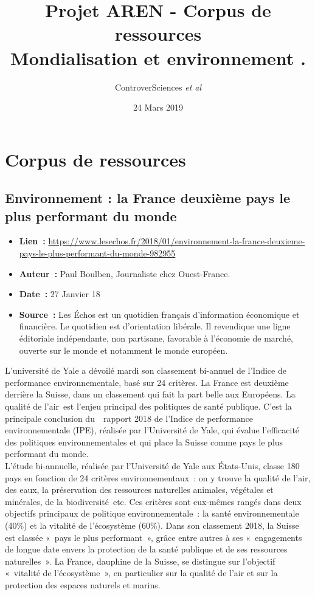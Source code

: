 \documentclass[8pt]{article}
\author{ControverSciences\textit{ et al} }
\title{Projet AREN - Corpus de ressources \\  Mondialisation et environnement .}
\date{24 Mars 2019}
\begin{document}
\section{Corpus de ressources}
\subsection{Environnement : la France deuxième pays le plus performant du monde}
\label{sec:definition}

\begin{itemize}
	\setlength\itemsep{-0.1em}
	\item \textbf{Lien~: }  \url{https://www.lesechos.fr/2018/01/environnement-la-france-deuxieme-pays-le-plus-performant-du-monde-982955} 
	\item \textbf{Auteur~: } Paul Boulben, Journaliste chez Ouest-France.
	\item \textbf{Date~: } 27 Janvier 18
	\item \textbf{Source~: } Les Échos est un quotidien français d’information économique et financière. Le quotidien est d'orientation libérale. Il revendique une ligne éditoriale indépendante, non partisane, favorable à l'économie de marché, ouverte sur le monde et notamment le monde européen. 
\end{itemize}

L'université de Yale a dévoilé mardi son classement bi-annuel de l'Indice de performance environnementale, basé sur 24 critères. La France est deuxième derrière la Suisse, dans un classement qui fait la part belle aux Européens.
La qualité de l'air est l'enjeu principal des politiques de santé publique. C'est la principale conclusion du  rapport 2018 de l'Indice de performance environnementale (IPE), réalisée par l'Université de Yale, qui évalue l'efficacité des politiques environnementales et qui place la Suisse comme pays le plus performant du monde.\\

L'étude bi-annuelle, réalisée par l'Université de Yale aux États-Unis, classe 180 pays en fonction de 24 critères environnementaux : on y trouve la qualité de l'air, des eaux, la préservation des ressources naturelles animales, végétales et minérales, de la biodiversité etc. Ces critères sont eux-mêmes rangés dans deux objectifs principaux de politique environnementale : la santé environnementale (40\%) et la vitalité de l'écosystème (60\%).
Dans son classement 2018, la Suisse est classée «\ pays le plus performant\ », grâce entre autres à ses «\ engagements de longue date envers la protection de la santé publique et de ses ressources naturelles\ ». La France, dauphine de la Suisse, se distingue sur l'objectif «\ vitalité de l'écosystème\ », en particulier sur la qualité de l'air et sur la protection des espaces naturels et marins.\\
\end{document}
